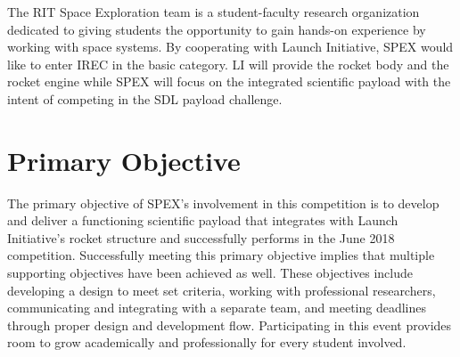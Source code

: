 \documentclass[conference]{IEEEtran} %
\begin{document}
The RIT Space Exploration team is a student-faculty research organization dedicated to giving students the opportunity to gain hands-on experience by working with space systems.
By cooperating with Launch Initiative, SPEX would like to enter IREC in the basic category. LI will provide the rocket body and the rocket engine while SPEX will focus on the
integrated scientific payload with the intent of competing in the SDL payload challenge.

\section{Primary Objective}
\label{sec:Primary Objective}
The primary objective of SPEX's involvement in this competition is to develop and deliver a functioning scientific payload that integrates with Launch Initiative's rocket
structure and successfully performs in the June 2018 competition. Successfully meeting this primary objective implies
that multiple supporting objectives have been achieved as well. These objectives include developing a design to meet set criteria, working with
professional researchers, communicating and integrating with a separate team, and meeting deadlines through proper design and development flow. Participating
in this event provides room to grow academically and professionally for every student involved.


\end{document}
